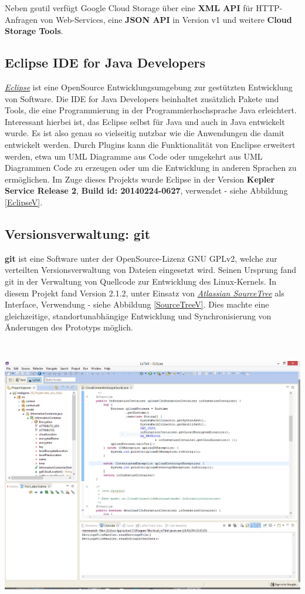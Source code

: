 \documentclass[13pt,a4paper,bibliography=totocnumbered,listof=totocnumbered]{scrartcl}
\begin{document}
Neben gsutil verfügt Google Cloud Storage über eine \textbf{XML API} für HTTP-Anfragen von Web-Services, eine \textbf{JSON API} in Version v1 und weitere \textbf{Cloud Storage Tools}.

\subsection{Eclipse IDE for Java Developers}
\href{https://www.eclipse.org/}{\textit{Eclipse}} ist eine OpenSource Entwicklungsumgebung zur gestützten Entwicklung von Software. Die IDE for Java Developers beinhaltet zusätzlich Pakete und Tools, die eine Programmierung in der Programmierhochsprache Java erleichtert. Interessant hierbei ist, das Eclipse selbst für Java und auch in Java entwickelt wurde. Es ist also genau so vielseitig nutzbar wie die Anwendungen die damit entwickelt werden. Durch Plugins kann die Funktionalität von Enclipse erweitert werden, etwa um UML Diagramme aus Code oder umgekehrt aus UML Diagrammen Code zu erzeugen oder um die Entwicklung in anderen Sprachen zu ermöglichen. Im Zuge dieses Projekts wurde Eclipse in der Version \textbf{Kepler Service Release 2}, \textbf{Build id: 20140224-0627}, verwendet - siehe Abbildung \ref{EclipseV}.

\subsection{Versionsverwaltung: git}
\textbf{git} ist eine Software unter der OpenSource-Lizenz GNU GPLv2, welche zur verteilten Versionsverwaltung von Dateien eingesetzt wird. Seinen Ursprung fand git in der Verwaltung von Quellcode zur Entwicklung des Linux-Kernels. In diesem Projekt fand Version 2.1.2, unter Einsatz von \href{https://www.atlassian.com/software/sourcetree/overview}{\textit{Atlassian SourceTree}} als Interface, Verwendung - siehe Abbildung \ref{SourceTreeV}. Dies machte eine gleichzeitige, standortunabhängige Entwicklung und Synchronisierung von Änderungen des Prototyps möglich.\\
 \cite{31}

$\;$\\
\begin{minipage}{\linewidth}
	\centering
	\includegraphics[width=0.8\linewidth]{./img/Eclipse.png}
	\label{EclipseV}
\end{minipage}
\end{document}
